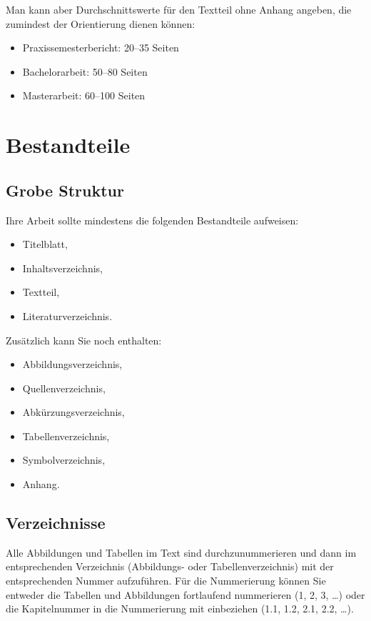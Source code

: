 \documentclass[a4paper,11pt,headings=normal]{scrartcl}
\begin{document}
Man kann aber Durchschnittswerte für den Textteil ohne Anhang angeben, die zumindest der Orientierung dienen können:

\begin{itemize}
\item Praxissemesterbericht: 20--35 Seiten
\item Bachelorarbeit: 50--80 Seiten
\item Masterarbeit: 60--100 Seiten
\end{itemize}

\section{Bestandteile}

\subsection{Grobe Struktur}
Ihre Arbeit sollte mindestens die folgenden Bestandteile aufweisen:

\begin{itemize}
\item Titelblatt,
\item Inhaltsverzeichnis,
\item Textteil,
\item Literaturverzeichnis.
\end{itemize}

Zusätzlich kann Sie noch enthalten:

\begin{itemize}
\item Abbildungsverzeichnis,
\item Quellenverzeichnis,
\item Abkürzungsverzeichnis,
\item Tabellenverzeichnis,
\item Symbolverzeichnis,
\item Anhang.
\end{itemize}

\subsection{Verzeichnisse}
Alle Abbildungen und Tabellen im Text sind durchzunummerieren und dann im entsprechenden Verzeichnis (Abbildungs- oder Tabellenverzeichnis) mit der entsprechenden Nummer aufzuführen. Für die Nummerierung können Sie entweder die Tabellen und Abbildungen fortlaufend nummerieren (1, 2, 3, \dots) oder die Kapitelnummer in die Nummerierung mit einbeziehen (1.1, 1.2, 2.1, 2.2, \dots).
\end{document}
